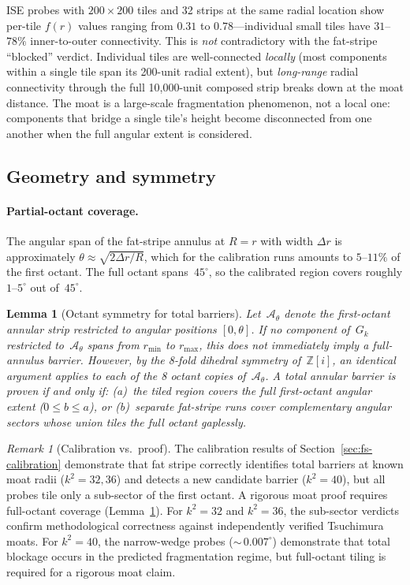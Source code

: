 \documentclass[11pt,a4paper]{article}
\newcommand{\Zi}{\mathbb{Z}[i]}
\newcommand{\Gk}{G_k}
\newcommand{\fr}{f(r)}
\theoremstyle{definition}
\theoremstyle{plain}
\newtheorem{lemma}[theorem]{Lemma}
\theoremstyle{remark}
\newtheorem{remark}[theorem]{Remark}
\begin{document}
ISE probes with $200 \times 200$ tiles and 32 strips at the same radial location show per-tile $\fr$ values ranging from $0.31$ to $0.78$---individual small tiles have $31$--$78\%$ inner-to-outer connectivity.  This is \emph{not} contradictory with the fat-stripe ``blocked'' verdict.  Individual tiles are well-connected \emph{locally} (most components within a single tile span its 200-unit radial extent), but \emph{long-range} radial connectivity through the full 10,000-unit composed strip breaks down at the moat distance.  The moat is a large-scale fragmentation phenomenon, not a local one: components that bridge a single tile's height become disconnected from one another when the full angular extent is considered.

\subsection{Geometry and symmetry}\label{sec:fs-geometry}

\paragraph{Partial-octant coverage.}
The angular span of the fat-stripe annulus at $R = r$ with width $\Delta r$ is approximately $\theta \approx \sqrt{2\Delta r / R}$, which for the calibration runs amounts to $5$--$11\%$ of the first octant.  The full octant spans~$45^\circ$, so the calibrated region covers roughly $1$--$5^\circ$ out of~$45^\circ$.

\begin{lemma}[Octant symmetry for total barriers]\label{lem:fs-octant}
Let~$\mathcal{A}_\theta$ denote the first-octant annular strip restricted to angular positions $[0, \theta]$.  If no component of~$\Gk$ restricted to~$\mathcal{A}_\theta$ spans from $r_{\min}$ to $r_{\max}$, this does not immediately imply a full-annulus barrier.  However, by the 8-fold dihedral symmetry of~$\Zi$, an identical argument applies to each of the 8 octant copies of~$\mathcal{A}_\theta$.  A total annular barrier is proven if and only if: \textup{(a)}~the tiled region covers the full first-octant angular extent ($0 \le b \le a$), or \textup{(b)}~separate fat-stripe runs cover complementary angular sectors whose union tiles the full octant gaplessly.
\end{lemma}

\begin{remark}[Calibration vs.\ proof]\label{rem:calibration-vs-proof}
The calibration results of Section~\ref{sec:fs-calibration} demonstrate that fat stripe correctly identifies total barriers at known moat radii ($k^2 = 32, 36$) and detects a new candidate barrier ($k^2 = 40$), but all probes tile only a sub-sector of the first octant.  A rigorous moat proof requires full-octant coverage (Lemma~\ref{lem:fs-octant}).  For $k^2 = 32$ and $k^2 = 36$, the sub-sector verdicts confirm methodological correctness against independently verified Tsuchimura moats.  For $k^2 = 40$, the narrow-wedge probes (${\sim}\,0.007^\circ$) demonstrate that total blockage occurs in the predicted fragmentation regime, but full-octant tiling is required for a rigorous moat claim.
\end{remark}
\end{document}
